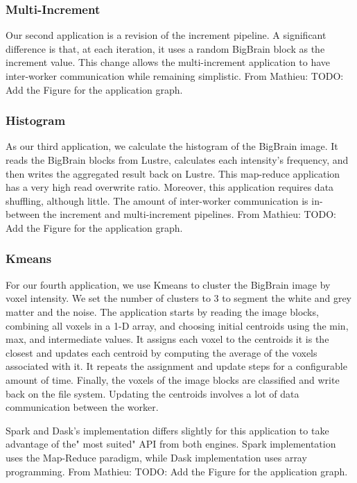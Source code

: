 \documentclass[conference]{IEEEtran}
\newcommand{\MD}[1]{\color{magenta}From Mathieu: #1 \color{black}}
\begin{document}
\subsubsection{Multi-Increment}
Our second application is a revision of the increment pipeline.
A significant difference is that, at each iteration, it uses a random BigBrain block as the increment value. 
This change allows the multi-increment application to have inter-worker communication while remaining simplistic.
\MD{TODO: Add the Figure for the application graph.}

\subsubsection{Histogram}
As our third application, we calculate the histogram of the BigBrain image. 
It reads the BigBrain blocks from Lustre, calculates each intensity's frequency, and then writes the aggregated result back on Lustre.
This map-reduce application has a very high read overwrite ratio.
Moreover, this application requires data shuffling, although little. 
The amount of inter-worker communication is in-between the increment and multi-increment pipelines.
\MD{TODO: Add the Figure for the application graph.}

\subsubsection{Kmeans} %
For our fourth application, we use Kmeans to cluster the BigBrain image by voxel intensity.
We set the number of clusters to 3 to segment the white and grey matter and the noise.
The application starts by reading the image blocks, combining all voxels in a 1-D array, and choosing initial centroids using the min, max, and intermediate values.
It assigns each voxel to the centroids it is the closest and updates each centroid by computing the average of the voxels associated with it. 
It repeats the assignment and update steps for a configurable amount of time. 
Finally, the voxels of the image blocks are classified and write back on the file system.
Updating the centroids involves a lot of data communication between the worker.

Spark and Dask's implementation differs slightly for this application to take advantage of the" most suited" API from both engines.
Spark implementation uses the Map-Reduce paradigm, while Dask implementation uses array programming.
\MD{TODO: Add the Figure for the application graph.}
\end{document}
